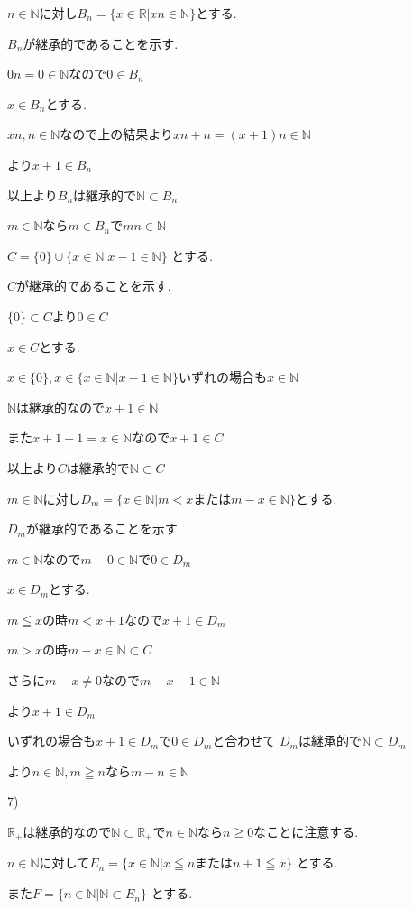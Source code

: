 \documentclass{jsarticle}
\begin{document}
$n\in \mathbb{N}$に対し$B_n=\{x\in \mathbb{R}|xn\in\mathbb{N}\}$とする.

$B_n$が継承的であることを示す.

$0n = 0\in \mathbb{N}$なので$0\in B_n$

$x\in B_n$とする.

$xn,n\in \mathbb{N}$なので上の結果より$xn+n=(x+1)n\in \mathbb{N}$

より$x+1\in B_n$

以上より$B_n$は継承的で$\mathbb{N} \subset B_n$

$m\in \mathbb{N}$なら$m\in B_n$で$mn\in\mathbb{N}$

$C=\{0\}\cup \{x\in \mathbb{N}|x-1\in\mathbb{N}\}$
とする.

$C$が継承的であることを示す.

$\{0\}\subset C$より$0\in C$

$x\in C$とする.

$x\in\{0\},x\in \{x\in \mathbb{N}|x-1\in\mathbb{N}\}$いずれの場合も$x\in\mathbb{N}$

$\mathbb{N}$は継承的なので$x+1\in\mathbb{N}$

また$x+1-1=x\in \mathbb{N}$なので$x+1\in C$

以上より$C$は継承的で$\mathbb{N} \subset C$

$m\in \mathbb{N}$に対し$D_m=\{x\in \mathbb{N}|m< x または m-x\in\mathbb{N}\}$とする.

$D_m$が継承的であることを示す.

$m\in \mathbb{N}$なので$m-0\in \mathbb{N}$で$0\in D_m$

$x\in D_m$とする.

$m\leqq x$の時$m<x+1$なので$x+1\in D_m$

$m>x$の時$m-x\in \mathbb{N}\subset C$

さらに$m-x\neq 0$なので$m-x-1\in\mathbb{N}$

より$x+1\in D_m$

いずれの場合も$x+1\in D_m$で$0\in D_m$と合わせて
$D_m$は継承的で$\mathbb{N} \subset D_m$

より$n\in \mathbb{N},m\geqq n$なら$m-n\in\mathbb{N}$

7)

$\mathbb{R}_+$は継承的なので$\mathbb{N}\subset \mathbb{R}_+$で$n\in \mathbb{N}$なら$n\geqq 0$なことに注意する.

$n\in \mathbb{N}$に対して$E_n=\{x\in \mathbb{N}|x\leqq nまたは n+1\leqq x\}$
とする.

また$F=\{n\in \mathbb{N}|\mathbb{N}\subset E_n\}$
とする.
\end{document}
